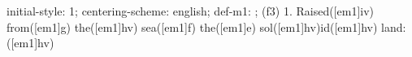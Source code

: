 initial-style: 1;
centering-scheme: english;
def-m1: \grealign;
(f3) 1. Raised([em1]iv) from([em1]g) the([em1]hv) sea([em1]f) the([em1]e) sol([em1]hv)id([em1]hv) land:([em1]hv)